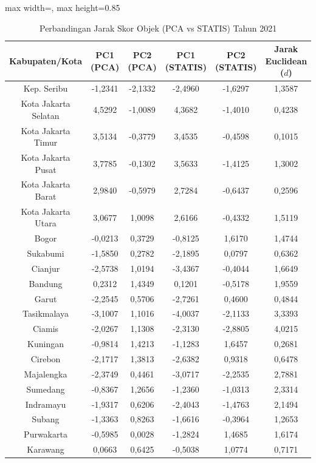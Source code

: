 \begin{table}[H]
\centering
\caption{Perbandingan Jarak Skor Objek (PCA vs STATIS) Tahun 2021} \label{tab:app1jarak_skor_2021}
\begin{adjustbox}{max width=\textwidth, max height=0.85\textheight}
\begin{tabular}{|c|c|c|c|c|c|}
\hline
\textbf{Kabupaten/Kota} & \textbf{PC1 (PCA)} & \textbf{PC2 (PCA)} & \textbf{PC1 (STATIS)} & \textbf{PC2 (STATIS)} & \textbf{Jarak Euclidean ($d$)} \\
\hline
Kep. Seribu & -1,2341 & -2,1332 & -2,4960 & -1,6297 & 1,3587 \\
Kota Jakarta Selatan & 4,5292 & -1,0089 & 4,3682 & -1,4010 & 0,4238 \\
Kota Jakarta Timur & 3,5134 & -0,3779 & 3,4535 & -0,4598 & 0,1015 \\
Kota Jakarta Pusat & 3,7785 & -0,1302 & 3,5633 & -1,4125 & 1,3002 \\
Kota Jakarta Barat & 2,9840 & -0,5979 & 2,7284 & -0,6437 & 0,2596 \\
Kota Jakarta Utara & 3,0677 & 1,0098 & 2,6166 & -0,4332 & 1,5119 \\
Bogor & -0,0213 & 0,3729 & -0,8125 & 1,6170 & 1,4744 \\
Sukabumi & -1,5850 & 0,2782 & -2,1895 & 0,0797 & 0,6362 \\
Cianjur & -2,5738 & 1,0194 & -3,4367 & -0,4044 & 1,6649 \\
Bandung & 0,2312 & 1,4349 & 0,1201 & -0,5178 & 1,9559 \\
Garut & -2,2545 & 0,5706 & -2,7261 & 0,4600 & 0,4844 \\
Tasikmalaya & -3,1007 & 1,1016 & -4,0037 & -2,1133 & 3,3393 \\
Ciamis & -2,0267 & 1,1308 & -2,3130 & -2,8805 & 4,0215 \\
Kuningan & -0,9814 & 1,4213 & -1,1283 & 1,6457 & 0,2681 \\
Cirebon & -2,1717 & 1,3813 & -2,6382 & 0,9318 & 0,6478 \\
Majalengka & -2,3749 & 0,4461 & -3,0717 & -2,2535 & 2,7881 \\
Sumedang & -0,8367 & 1,2656 & -1,2360 & -1,0313 & 2,3314 \\
Indramayu & -1,9317 & 0,6206 & -2,4043 & -1,4763 & 2,1494 \\
Subang & -1,3363 & 0,8263 & -1,6616 & -0,3964 & 1,2653 \\
Purwakarta & -0,5985 & 0,0028 & -1,2824 & 1,4685 & 1,6174 \\
Karawang & 0,0663 & 0,6425 & -0,5038 & 1,0774 & 0,7171 \\

\end{tabular}
\end{adjustbox}
\end{table}
